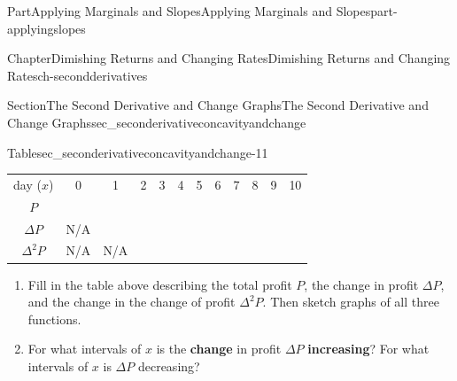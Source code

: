 \documentclass{tufte-book}
\newcommand{\tabularfont}{\relax}
\newcommand{\terminology}[1]{\textbf{#1}}
\numberwithin{equation}{chapter}
\def \tikzhistogram (#1,#2){\draw[fill=blue,opacity=0.3] ({#1+((\xtwo-\xmin)/5)},#2) rectangle ({#1-((\xtwo-\xmin)/5)},0); \draw[draw,thick] ({#1+((\xtwo-\xmin)/5)},#2) rectangle ({#1-((\xtwo-\xmin)/5)},0); \node[draw,fill=blue, circle,inner sep=2.5pt] at (#1,#2) {};}
\begin{document}
\begin{partptx}{Part}{Applying Marginals and Slopes}{}{Applying Marginals and Slopes}{}{}{part-applyingslopes}
\begin{chapterptx}{Chapter}{Dimishing Returns and Changing Rates}{}{Dimishing Returns and Changing Rates}{}{}{ch-secondderivatives}
\begin{sectionptx}{Section}{The Second Derivative and Change Graphs}{}{The Second Derivative and Change Graphs}{}{}{sec_seconderivativeconcavityandchange}
\begin{image}{0}{1}{0}{}
{
}%
\end{image}%
\begin{tableptx}{Table}{\textbf{}}{sec_seconderivativeconcavityandchange-11}{}%
\centering%
{\tabularfont%
\begin{tabular}{llllllllllll}
\multicolumn{1}{c}{day (\(x\))}&\multicolumn{1}{c}{0}&\multicolumn{1}{c}{1}&\multicolumn{1}{c}{2}&\multicolumn{1}{c}{3}&\multicolumn{1}{c}{4}&\multicolumn{1}{c}{5}&\multicolumn{1}{c}{6}&\multicolumn{1}{c}{7}&\multicolumn{1}{c}{8}&\multicolumn{1}{c}{9}&\multicolumn{1}{c}{10}\tabularnewline[0pt]
\multicolumn{1}{c}{\(P\)}&\multicolumn{1}{c}{}&\multicolumn{1}{c}{}&\multicolumn{1}{c}{}&\multicolumn{1}{c}{}&\multicolumn{1}{c}{}&\multicolumn{1}{c}{}&\multicolumn{1}{c}{}&\multicolumn{1}{c}{}&\multicolumn{1}{c}{}&\multicolumn{1}{c}{}&\multicolumn{1}{c}{}\tabularnewline[0pt]
\multicolumn{1}{c}{\(\Delta P\)}&\multicolumn{1}{c}{N\slash{}A}&\multicolumn{1}{c}{}&\multicolumn{1}{c}{}&\multicolumn{1}{c}{}&\multicolumn{1}{c}{}&\multicolumn{1}{c}{}&\multicolumn{1}{c}{}&\multicolumn{1}{c}{}&\multicolumn{1}{c}{}&\multicolumn{1}{c}{}&\multicolumn{1}{c}{}\tabularnewline[0pt]
\multicolumn{1}{c}{\(\Delta^2 P\)}&\multicolumn{1}{c}{N\slash{}A}&\multicolumn{1}{c}{N\slash{}A}&\multicolumn{1}{c}{}&\multicolumn{1}{c}{}&\multicolumn{1}{c}{}&\multicolumn{1}{c}{}&\multicolumn{1}{c}{}&\multicolumn{1}{c}{}&\multicolumn{1}{c}{}&\multicolumn{1}{c}{}&\multicolumn{1}{c}{}
\end{tabular}
}%
\end{tableptx}%
%
\begin{enumerate}
\item{}Fill in the table above describing the total profit \(P\), the change in profit \(\Delta P\), and the change in the change of profit \(\Delta^2 P\). Then sketch graphs of all three functions.%
\item{}For what intervals of \(x\) is the \terminology{change} in profit \(\Delta P\) \terminology{increasing}? For what intervals of \(x\) is \(\Delta P\) decreasing?%

\end{enumerate}
\end{sectionptx}
\end{chapterptx}
\end{partptx}
\end{document}
